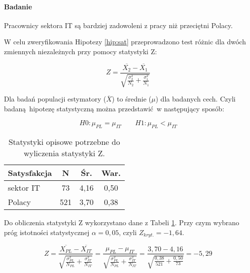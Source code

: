\paragraph{Badanie}
\begin{hyp}
  Pracownicy sektora IT są bardziej zadowoleni z pracy niż przeciętni Polacy.
  \label{hip:sat}
\end{hyp}

W celu zweryfikowania Hipotezy \ref{hip:sat} przeprowadzono test różnic dla dwóch zmiennych niezależnych przy pomocy statystyki Z:

\begin{equation}
  Z = \frac{\overline{X_2} - \overline{X_1}}{\sqrt{\frac{\sigma^2_2}{N_2}+\frac{\sigma^2_1}{N_1}}}
\end{equation}

Dla badań populacji estymatory ($\overline{X}$) to średnie ($\mu$) dla badanych cech. Czyli badaną hipotezę statystyczną można przedstawić w następujący sposób:

\begin{equation}
  H0: \mu_{PL} = \mu_{IT} \qquad H1: \mu_{PL} < \mu_{IT}
\end{equation}

\begin{table}[h!b]
  \begin{center}
    \begin{tabular}{l | c c c }
      Satysfakcja & N & Śr. & War. \\ \hline
      sektor IT & 73 & 4,16 & 0,50 \\
      Polacy & 521 & 3,70 & 0,38 \\
    \end{tabular}
  \end{center}
  \caption{Statystyki opisowe potrzebne do wyliczenia statystyki Z.}
  \label{tab:jss-norms-data}
\end{table}

Do obliczenia statystyki Z wykorzystano dane z Tabeli \ref{tab:jss-norms-data}. Przy czym wybrano próg istotności statystycznej $\alpha = 0,05$, czyli $Z_{kryt.} = -1,64$.

\begin{equation}
  Z = \frac{\overline{X_{PL}} - \overline{X_{IT}}}{\sqrt{\frac{\sigma^2_{PL}}{N_{PL}}+\frac{\sigma^2_{IT}}{N_{IT}}}} = \frac{\mu_{PL} - \mu_{IT}}{\sqrt{\frac{\sigma^2_{PL}}{N_{PL}}+\frac{\sigma^2_{IT}}{N_{IT}}}} = \frac{3,70 - 4,16}{\sqrt{\frac{0,38}{521}+\frac{0,50}{73}}} = -5,29 
\end{equation}

